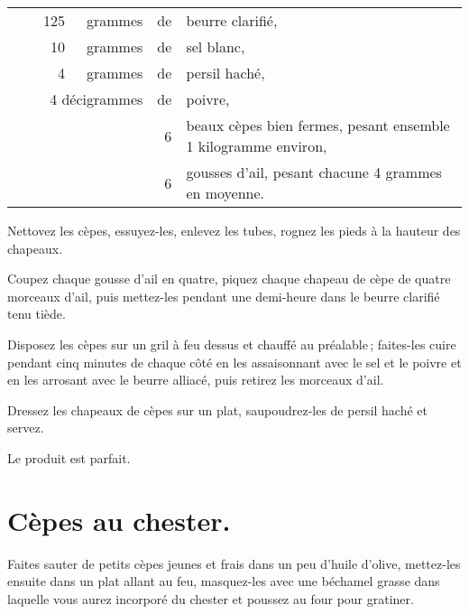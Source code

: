 \footnotesize
\begin{longtable}{rrrrrp{18em}}
  & \hspace{2em} & 125 & grammes & de & beurre clarifié,                                                  \\
  & \hspace{2em} &  10 & grammes & de & sel blanc,                                                        \\
  & \hspace{2em} &   4 & grammes & de & persil haché,                                                     \\
  & \multicolumn{3}{r}{4 décigrammes} & de & poivre,                                                      \\
  & \hspace{2em} &     &         &  6 & beaux cèpes bien fermes, pesant ensemble 1 kilogramme environ,    \\
  & \hspace{2em} &     &         &  6 & gousses d'ail, pesant chacune 4 grammes en moyenne.               \\
\end{longtable}
\normalsize

Nettovez les cèpes, essuyez-les, enlevez les tubes, rognez les pieds à la
hauteur des chapeaux.

Coupez chaque gousse d'ail en quatre, piquez chaque chapeau de cèpe de quatre
morceaux d'ail, puis mettez-les pendant une demi-heure dans le beurre clarifié
tenu tiède.

Disposez les cèpes sur un gril à feu dessus et chauffé au préalable ;
faites-les cuire pendant cinq minutes de chaque côté en les assaisonnant avec
le sel et le poivre et en les arrosant avec le beurre alliacé, puis retirez les
morceaux d'ail.

Dressez les chapeaux de cèpes sur un plat, saupoudrez-les de persil haché et
servez.

Le produit est parfait.

\section*{\centering Cèpes au chester.}
{}

Faites sauter de petits cèpes jeunes et frais dans un peu d'huile d'olive,
mettez-les ensuite dans un plat allant au feu, masquez-les avec une béchamel
grasse dans laquelle vous aurez incorporé du chester et poussez au four pour
gratiner.


